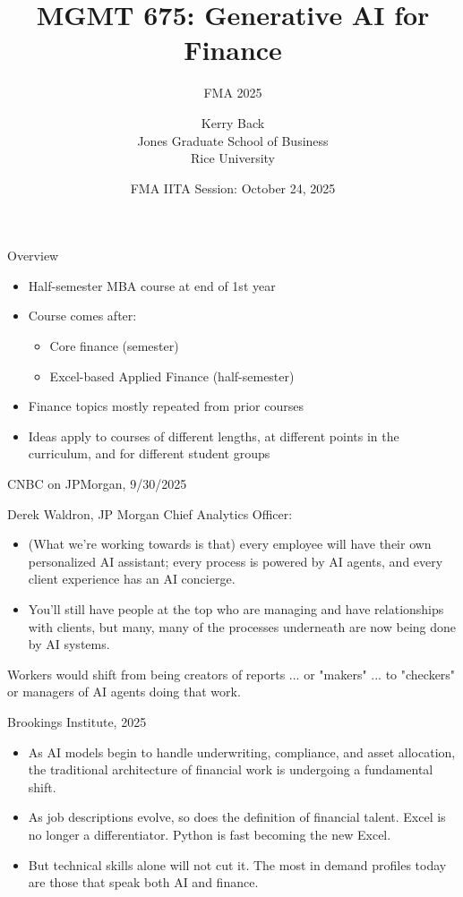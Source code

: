 \documentclass{beamer}
\title{MGMT 675: Generative AI for Finance}
\subtitle{FMA 2025}
\date{FMA IITA Session: October 24, 2025}
\author{Kerry Back\\ 
Jones Graduate School of Business\\
Rice University}
\begin{document}
\initclock

\maketitle


\begin{frame}{Overview}
    \begin{itemize}
    \item Half-semester MBA course at end of 1st year
    \item Course comes after: 
    \begin{itemize}
    \item Core finance (semester) 
    \item Excel-based Applied Finance (half-semester)
    \end{itemize}
    \item Finance topics mostly repeated from prior courses
    \item Ideas apply to courses of different lengths, at different points in the curriculum, and for different student groups
    \end{itemize}

\end{frame}


\begin{frame}{CNBC on JPMorgan, 9/30/2025}

Derek Waldron, JP Morgan Chief Analytics Officer:
\begin{itemize}
\item (What we're working towards is that) every employee will have their own personalized AI assistant; every process is powered by AI agents, and every client experience has an AI concierge.
\item You'll still have people at the top who are managing and have relationships with clients, but many, many of the processes underneath are now being done by AI systems.
\end{itemize}


Workers would shift from being creators of reports ... or "makers" ... to "checkers" or managers of AI agents doing that work.

\end{frame}

\begin{frame}{Brookings Institute, 2025}

\begin{itemize}
\item As AI models begin to handle underwriting, compliance, and asset allocation, the traditional architecture of financial work is undergoing a fundamental shift.
\item As job descriptions evolve, so does the definition of financial talent. Excel is no longer a differentiator. Python is fast becoming the new Excel. 
\item But technical skills alone will not cut it. The most in demand profiles today are those that speak both AI and finance.
\end{itemize}
\end{frame}
\end{document}
